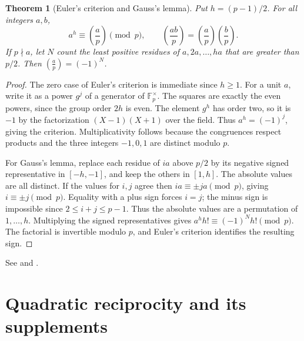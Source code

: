 \documentclass[11pt,oneside,openany]{book}
\theoremstyle{plain}
\newtheorem{theorem}{Theorem}[chapter]
\theoremstyle{definition}
\theoremstyle{remark}
\begin{document}
\begin{theorem}[Euler's criterion and Gauss's lemma]\label{nt:B06}
Put $h=(p-1)/2$. For all integers $a,b$,
\[
 a^h\equiv\left(\frac ap\right)\pmod p,\qquad
 \left(\frac{ab}p\right)=\left(\frac ap\right)\left(\frac bp\right).
\]
If $p\nmid a$, let $N$ count the least positive residues of
$a,2a,\ldots,ha$ that are greater than $p/2$. Then
$\left(\frac ap\right)=(-1)^N$.
\end{theorem}
\begin{proof}
The zero case of Euler's criterion is immediate since $h\ge1$.
For a unit $a$, write it as a power $g^j$ of a generator of
$\mathbb F_p^\times$. The squares are exactly the even powers,
since the group order $2h$ is even. The element $g^h$ has order
two, so it is $-1$ by the factorization $(X-1)(X+1)$ over the
field. Thus $a^h=(-1)^j$, giving the criterion. Multiplicativity
follows because the congruences respect products and the three
integers $-1,0,1$ are distinct modulo $p$.

For Gauss's lemma, replace each residue of $ia$ above $p/2$
by its negative signed representative in $[-h,-1]$, and keep the
others in $[1,h]$. The absolute values are all distinct. If the
values for $i,j$ agree then $ia\equiv\pm ja\pmod p$, giving
$i\equiv\pm j\pmod p$. Equality with a plus sign forces $i=j$;
the minus sign is impossible since $2\le i+j\le p-1$. Thus
the absolute values are a permutation of $1,\ldots,h$.
Multiplying the signed representatives gives
$a^h h!\equiv(-1)^N h!\pmod p$. The factorial is invertible
modulo $p$, and Euler's criterion identifies the resulting sign.
\end{proof}
See \cite[\S\S9.1--9.4]{apostol} and \cite[\S\S3.1--3.2]{nzm}.

\section{Quadratic reciprocity and its supplements}
\end{document}
